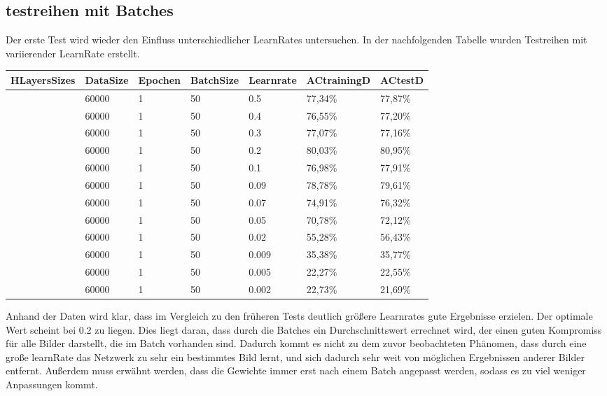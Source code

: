 \documentclass[12pt]{article}
\begin{document}
\subsection{testreihen mit Batches}
Der erste Test wird wieder den Einfluss unterschiedlicher LearnRates untersuchen.
In der nachfolgenden Tabelle wurden Testreihen mit variierender LearnRate erstellt. 
\begin{table}[H]
    \centering
    \begin{tabular}{|l|l|l|l|l|l|l|}
    \hline
        HLayersSizes & DataSize & Epochen & BatchSize & Learnrate & ACtrainingD & ACtestD \\ \hline
        [784, 100, 10] & 60000 & 1 & 50 & 0.5 & 77,34\% & 77,87\% \\ \hline
        [784, 100, 10] & 60000 & 1 & 50 & 0.4 & 76,55\% & 77,20\% \\ \hline
        [784, 100, 10] & 60000 & 1 & 50 & 0.3 & 77,07\% & 77,16\% \\ \hline
        [784, 100, 10] & 60000 & 1 & 50 & 0.2 & 80,03\% & 80,95\% \\ \hline
        [784, 100, 10] & 60000 & 1 & 50 & 0.1 & 76,98\% & 77,91\% \\ \hline
        [784, 100, 10] & 60000 & 1 & 50 & 0.09 & 78,78\% & 79,61\% \\ \hline
        [784, 100, 10] & 60000 & 1 & 50 & 0.07 & 74,91\% & 76,32\% \\ \hline
        [784, 100, 10] & 60000 & 1 & 50 & 0.05 & 70,78\% & 72,12\% \\ \hline
        [784, 100, 10] & 60000 & 1 & 50 & 0.02 & 55,28\% & 56,43\% \\ \hline
        [784, 100, 10] & 60000 & 1 & 50 & 0.009 & 35,38\% & 35,77\% \\ \hline
        [784, 100, 10] & 60000 & 1 & 50 & 0.005 & 22,27\% & 22,55\% \\ \hline
        [784, 100, 10] & 60000 & 1 & 50 & 0.002 & 22,73\% & 21,69\% \\ \hline
    \end{tabular}
\end{table}
Anhand der Daten wird klar, dass im Vergleich zu den früheren Tests deutlich größere Learnrates gute Ergebnisse erzielen. Der optimale Wert scheint bei 0.2 zu liegen. Dies liegt daran, dass durch die Batches ein Durchschnittswert errechnet wird, der einen guten Kompromiss für alle Bilder darstellt, die im Batch vorhanden sind. Dadurch kommt es nicht zu dem zuvor beobachteten Phänomen, dass durch eine große learnRate das Netzwerk zu sehr ein bestimmtes Bild lernt, und sich dadurch sehr weit von möglichen Ergebnissen anderer Bilder entfernt. Außerdem muss erwähnt werden, dass die Gewichte immer erst nach einem Batch angepasst werden, sodass es zu viel weniger Anpassungen kommt. 
\end{document}
